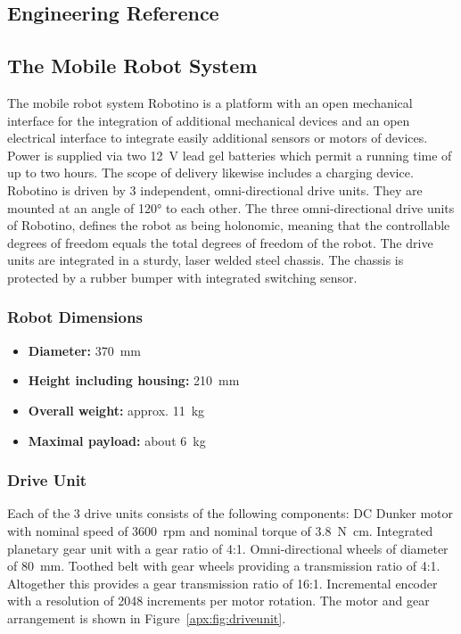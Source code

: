 \documentclass[12pt,twoside]{article}
\begin{document}
\begin{appendix}
\newpage

\section{Engineering Reference} \label{apx:sec:engref}
\subsection{The Mobile Robot System}
The mobile robot system Robotino is a platform with an open
mechanical interface for the integration of additional mechanical
devices and an open electrical interface to integrate easily
additional sensors or motors of devices. Power is supplied via two
\SI{12}{\volt} lead gel batteries which permit a running time of up to
two hours.  The scope of delivery likewise includes a charging
device. Robotino is driven by 3 independent, omni-directional drive
units. They are mounted at an angle of \ang{120} to each other. The
three omni-directional drive units of Robotino, defines the robot as
being holonomic, meaning that the controllable degrees of freedom
equals the total degrees of freedom of the robot. The drive units are
integrated in a sturdy, laser welded steel chassis. The chassis is
protected by a rubber bumper with integrated switching sensor.

\subsubsection{Robot Dimensions}\label{apx:sec:robot}
\begin{itemize}
	\item[] \textbf{Diameter:} \SI{370}{\milli\metre}
	\item[] \textbf{Height including housing:} \SI{210}{\milli\metre}
 	\item[] \textbf{Overall weight:} approx. \SI{11}{\kilogram}
 	\item[] \textbf{Maximal payload:} about \SI{6}{\kilogram}
 \end{itemize}

\subsubsection{Drive Unit}
Each of the 3 drive units consists of the following components: DC
Dunker motor with nominal speed of \SI{3600}{rpm} and nominal torque
of \SI{3.8}{\newton\centi\metre}. Integrated planetary gear unit with
a gear ratio of 4:1. Omni-directional wheels of diameter of
\SI{80}{\milli\metre}. Toothed belt with gear wheels providing a
transmission ratio of 4:1.
%
Altogether this provides a gear transmission ratio of
16:1. Incremental encoder with a resolution of 2048 increments per
motor rotation.
%
The motor and gear arrangement is shown in
Figure~\ref{apx:fig:driveunit}.


\end{appendix}
\end{document}
